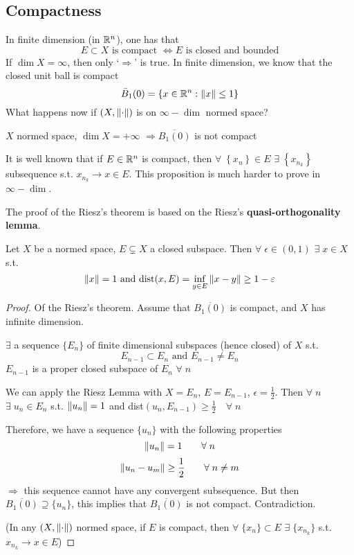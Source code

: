 \subsection*{Compactness}
In finite dimension (in \(\mathbb{R}^n\)), one has that
\[
    E \subset X \mbox{ is compact } \Leftrightarrow E \mbox{ is closed and bounded}
\]
If \(\dim X = \infty\), then only `\(\Rightarrow\)' is true. In finite dimension, we know that the closed unit ball is compact
\[
    \bar{B}_1(0) = \left\{ x \in \mathbb{R}^n : \norm{x} \leq 1\right\}
\]
What happens now if \((X, \norm{\cdot})\) is on \(\infty-\dim\) normed space?
\begin{theorem}
    \(X\) normed space, \(\dim X = +\infty\) \(\Rightarrow \overline{B_1(0)}\) is not compact
\end{theorem}
\begin{remark}
    It is well known that if \(E \in \mathbb{R}^n\) is compact, then \(\forall \; \left\{ x_n \right\} \in E \) \(\exists \; \left\{ x_{n_k} \right\}\) subsequence s.t. \(x_{n_k} \to x \in E\).  
    This proposition is much harder to prove in \(\infty-\dim\).
\end{remark}
The proof of the Riesz's theorem is based on the Riesz's \textbf{quasi-orthogonality lemma}.
\begin{lemma}
    Let \(X\) be a normed space, \(E \subsetneq X\) a closed subspace. 
    Then \(\forall \; \epsilon \in (0,1)\) \(\exists \; x \in X\) s.t.
    \[
        \norm{x}=1 \text{ and dist}(x, E) = \inf_{y \in E} \norm{x-y} \geq 1- \varepsilon
    \]
\end{lemma}
\begin{proof}
    Of the Riesz's theorem. Assume that \(\overline{B_1(0)}\) is compact, and \(X \) has infinite dimension. 

    \(\exists\) a sequence \(\{E_n\}\) of finite dimensional subspaces (hence closed) of \(X\) s.t. 
    \[
        E_{n-1} \subset E_n \text{ and } E_{n-1} \neq E_n
    \]
    \(E_{n-1}\) is a proper closed subspace of \(E_n\) \(\forall\; n\)

    We can apply the Riesz Lemma with \(X = E_n\), \(E=E_{n-1}\), \(\epsilon=\frac{1}{2}\). 
    Then \(\forall \; n\) \(\exists \; u_n \in E_n  \) s.t. \(\norm{u_n}=1\) and dist\((u_n, E_{n-1}) \geq \frac{1}{2} \quad \forall\; n\)
    
    Therefore, we have a sequence \(\{u_n\}\) with the following properties 
    \[
        \norm{u_n}=1 \qquad \forall\; n
    \]
    \[
        \norm{u_n-u_m} \geq \frac{1}{2} \qquad \forall\; n \neq m
    \]
    \(\Rightarrow\) this sequence cannot have any convergent subsequence. 
    But then \(\overline{B_1(0)} \supseteq \{u_n\}\), this implies that \(\overline{B_1(0)}\) is not compact.
    Contradiction.

    (In any \(\left(X, \norm{\cdot}\right)\) normed space, if \(E\) is compact, 
    then \(\forall\; \{x_n\} \subset E \) \(\exists \; \{x_{n_k}\}\) s.t. \(x_{n_k} \rightarrow x \in E\))
\end{proof}

